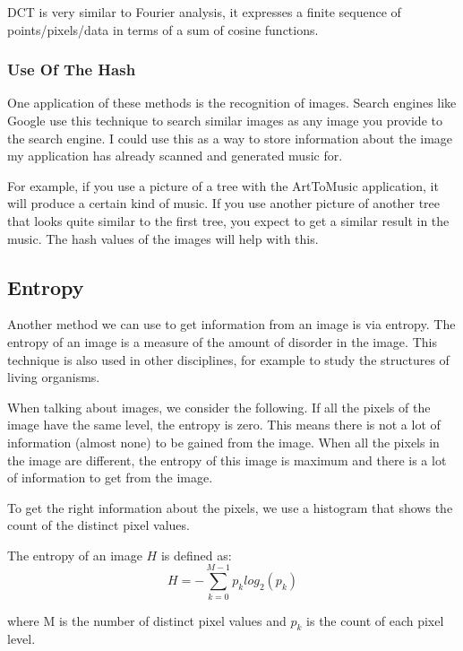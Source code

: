 \documentclass[12pt]{article}
\begin{document}
DCT is very similar to Fourier analysis, it expresses a finite sequence of points/pixels/data in terms of a sum of cosine functions.

\subsubsection{Use Of The Hash}
One application of these methods is the recognition of images. Search engines like Google use this technique to search similar images as any image you provide to the search engine. I could use this as a way to store information about the image my application has already scanned and generated music for.
\newline

For example, if you use a picture of a tree with the ArtToMusic application, it will produce a certain kind of music. If you use another picture of another tree that looks quite similar to the first tree, you expect to get a similar result in the music. The hash values of the images will help with this. 

\subsection{Entropy}

Another method we can use to get information from an image is via entropy.
The entropy of an image is a measure of the amount of disorder in the image. This technique is also used in other disciplines, for example to study the structures of living organisms.
\newline

When talking about images, we consider the following. If all the pixels of the image have the same level, the entropy is zero. This means there is not a lot of information (almost none) to be gained from the image. When all the pixels in the image are different, the entropy of this image is maximum and there is a lot of information to get from the image.
\newline

To get the right information about the pixels, we use a histogram that shows the count of the distinct pixel values. 
\newline

The entropy of an image $H$ is defined as:
\begin{equation}
H = - \sum_{k=0}^{M-1} p_k log_2 (p_k)
\end{equation}

where M is the number of distinct pixel values and $p_k$ is the count of each pixel level.
\newline
\end{document}
